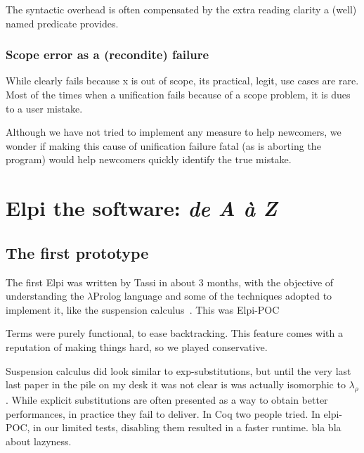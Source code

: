 \documentclass[a4paper, 11pt]{book}
\begin{document}
The syntactic overhead is often compensated by the extra
reading clarity a (well) named predicate provides.

\subsection{Scope error as a (recondite) failure}

While  clearly fails because x is
out of scope, its practical, legit, use cases are rare.
Most of the times when a unification fails because of
a scope problem, it is dues to a user mistake.

Although we have not tried to implement any measure to help
newcomers, we wonder if making this cause of unification failure
fatal (as is aborting the program) would help newcomers quickly
identify the true mistake.


\chapter{Elpi the software: \emph{de A \`a Z}}

\section{The first prototype}

The first Elpi was written by Tassi in about 3 months, with the objective
of understanding the $\lambda$Prolog language and some of the techniques
adopted to implement it, like the suspension calculus~\cite{NADATHUR200235}.
This was Elpi-POC

Terms were purely functional, to ease backtracking. This feature comes
with a reputation of making things hard, so we played conservative.

Suspension calculus did look similar to exp-substitutions, but until the very
last last paper in the pile on my desk it was not clear is was actually isomorphic
to $\lambda_\rho$. While explicit substitutions are often presented as a way to
obtain better performances, in practice they fail to deliver. In Coq two
people tried. In elpi-POC, in our limited tests, disabling them resulted in
a faster runtime.  bla bla about lazyness.
\end{document}
